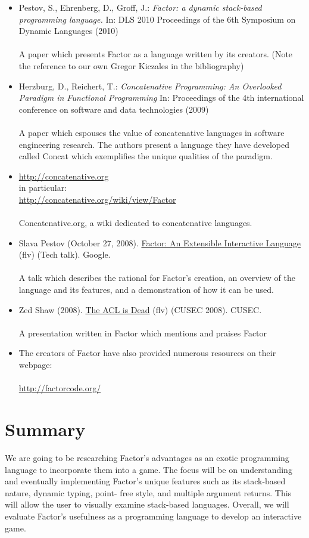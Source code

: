 \documentclass{sig-alternate}
\begin{document}
\begin{itemize}
\item Pestov, S., Ehrenberg, D., Groff, J.: \textit{Factor: a dynamic stack-based programming
language.} In: DLS 2010 Proceedings of the 6th Symposium on Dynamic Languages
(2010)\\\\A paper which presents Factor as a language written by its creators. (Note the
reference to our own Gregor Kiczales in the bibliography)
\item Herzburg, D., Reichert, T.: \textit{Concatenative Programming:
An Overlooked Paradigm in Functional Programming} In: Proceedings of the 4th
international conference on software and data technologies (2009)
\\\\A paper which espouses the value of concatenative languages in software engineering 
research. The authors present a language they have developed called Concat which exemplifies the unique qualities of the paradigm.
\item \url{http://concatenative.org}\\
in particular:\\\url{http://concatenative.org/wiki/view/Factor}\\\\Concatenative.org, a wiki dedicated to concatenative languages.
\item Slava Pestov (October 27, 2008). \href{http://youtu.be/f_0QlhYlS8g}{Factor: An Extensible Interactive Language} (flv) (Tech talk). Google.\\\\A talk which describes the rational for Factor's creation, an overview of the language and its features, and a demonstration of how it can be used.
\item Zed Shaw (2008). \href{http://vimeo.com/2723800}{The ACL is Dead} (flv) (CUSEC 2008). CUSEC.\\\\
A presentation written in Factor which mentions and praises Factor
\item The creators of Factor have also provided numerous resources on their webpage:\\\\\url{http://factorcode.org/}
\end{itemize}


\section{Summary} We are going to be researching Factor's advantages
as an exotic programming language to incorporate them into a game. The
focus will be on understanding and eventually implementing Factor's
unique features such as its stack-based nature, dynamic typing, point-
free style, and multiple argument returns. This will allow the user to
visually examine stack-based languages. Overall, we will evaluate
Factor's usefulness as a programming language to develop an
interactive game.


\balancecolumns
\end{document}
